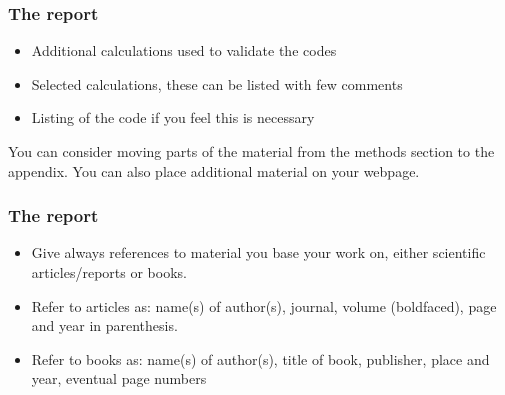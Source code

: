 \documentclass{beamer}
\newenvironment{block_mdfboxadmon}[1][]{\begin{block}{#1}}{\end{block}}
\begin{document}
\begin{frame}
\frametitle{The report}

\begin{block_mdfboxadmon}
\begin{itemize}
 \item Additional calculations used to validate the codes

 \item Selected calculations, these can be listed with  few comments

 \item Listing of the code if you feel this is necessary
\end{itemize}

\noindent
You can consider moving parts of the material from the methods section to the appendix. You can also place additional material on your webpage.
\end{block_mdfboxadmon}
\end{frame}

\begin{frame}
\frametitle{The report}

\begin{block_mdfboxadmon}
\begin{itemize}
 \item Give always references to material you base your work on, either  scientific articles/reports or books.

 \item Refer to articles as: name(s) of author(s), journal, volume (boldfaced), page and year in parenthesis.

 \item Refer to books as: name(s) of author(s), title of book, publisher, place and year, eventual page numbers
\end{itemize}

\noindent
\end{block_mdfboxadmon}
\end{frame}
\end{document}
